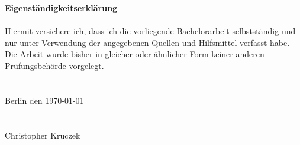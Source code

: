 \documentclass[fontsize=12pt,paper=A4,pagesize,DIV=calc,BCOR=1cm]{scrreprt}
\begin{document}
\LARGE\textbf{Eigenst\"andigkeitserkl\"arung}\\\\
Hiermit versichere ich, dass ich die vorliegende Bachelorarbeit selbstst\"andig und nur unter 
Verwendung der angegebenen Quellen und Hilfsmittel verfasst habe. Die Arbeit wurde bisher 
in gleicher oder \"ahnlicher Form keiner anderen Pr\"ufungsbeh\"orde vorgelegt.\\\\\\
Berlin den \today \\\\\\
Christopher Kruczek
\end{document}
